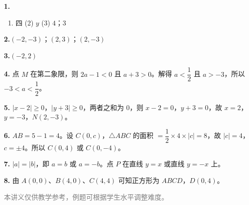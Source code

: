 \documentclass[12pt, a4paper]{ctexart}
\begin{document}
\begin{knowledgebox}[参考答案]
\textbf{1.}
\begin{enumerate}[label=(\arabic*)]
  \item 四 \quad (2) $y$ \quad (3) $4$；$3$
\end{enumerate}

\textbf{2.}\quad $(-2, -3)$；\quad $(2, 3)$；\quad $(2, -3)$

\medskip
\textbf{3.}\quad $(-2, 2)$

\medskip
\textbf{4.} 点 $M$ 在第二象限，则 $2a - 1 < 0$ 且 $a + 3 > 0$。解得 $a < \dfrac{1}{2}$ 且 $a > -3$，所以 $\boxed{-3 < a < \dfrac{1}{2}}$。

\medskip
\textbf{5.} $|x - 2| \geqslant 0$，$|y + 3| \geqslant 0$，两者之和为 $0$，则 $x - 2 = 0$，$y + 3 = 0$，故 $x = 2$，$y = -3$，$N(2, -3)$。

\medskip
\textbf{6.} $AB = 5 - 1 = 4$。设 $C(0, c)$，$\triangle ABC$ 的面积 $= \dfrac{1}{2} \times 4 \times |c| = 8$，故 $|c| = 4$，$c = \pm 4$。所以 $C(0, 4)$ 或 $C(0, -4)$。

\medskip
\textbf{7.} $|a| = |b|$，即 $a = b$ 或 $a = -b$。点 $P$ 在直线 $y = x$ 或直线 $y = -x$ 上。

\medskip
\textbf{8.} 由 $A(0,0)$、$B(4,0)$、$C(4,4)$ 可知正方形为 $ABCD$，$D(0, 4)$。
\end{knowledgebox}

\vfill
\begin{center}
\small\textcolor{gray}{本讲义仅供教学参考，例题可根据学生水平调整难度。}
\end{center}
\end{document}
